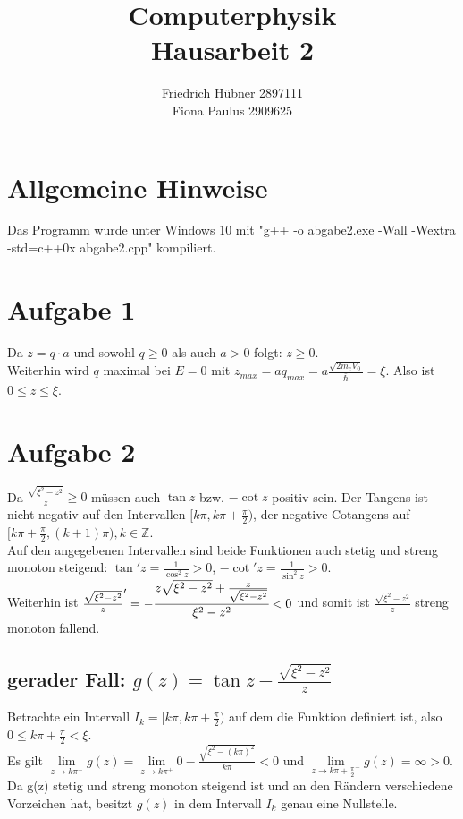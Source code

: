 \documentclass{scrartcl}
\author{Friedrich Hübner 2897111\\
Fiona Paulus 2909625}
\title{Computerphysik\\Hausarbeit 2}
\begin{document}
\maketitle
\newpage

\section{Allgemeine Hinweise}
Das Programm wurde unter Windows 10 mit "g++ -o abgabe2.exe -Wall -Wextra -std=c++0x abgabe2.cpp" kompiliert.

\section{Aufgabe 1}
Da $z = q \cdot a$ und sowohl $q\geq 0$ als auch $a > 0$ folgt: $z \geq 0$.\\
Weiterhin wird $q$ maximal bei $E = 0$ mit $z_{max} = a q_{max} = a\frac{\sqrt{2m_eV_0}}{\bar{\hslash}} = \xi$. Also ist $0 \leq z \leq \xi$.

\section{Aufgabe 2}
Da $\frac{\sqrt{\xi^2-z^2}}{z} \geq 0$ müssen auch $\tan z$ bzw. $-\cot z$ positiv sein. Der Tangens ist nicht-negativ auf den Intervallen $[k\pi, k\pi+\frac{\pi}{2})$, der negative Cotangens auf $[k\pi+\frac{\pi}{2}, (k+1)\pi), k \in \mathbb{Z}$.\\
Auf den angegebenen Intervallen sind beide Funktionen auch stetig und streng monoton steigend: $\tan' z = \frac{1}{\cos^2 z} > 0$, $-\cot' z = \frac{1}{\sin^2 z} > 0$.\\
Weiterhin ist $\frac{\sqrt{\xi^2-z^2}}{z}' = -\cfrac{z\sqrt{\xi^2-z^2} + \frac{z}{\sqrt{\xi^2-z^2}}}{\xi^2-z^2} < 0$ und somit ist $\frac{\sqrt{\xi^2-z^2}}{z}$ streng monoton fallend.\\

\subsection{gerader Fall: $g(z) = \tan z - \frac{\sqrt{\xi^2-z^2}}{z}$}

Betrachte ein Intervall $I_k = [k\pi, k\pi+\frac{\pi}{2})$ auf dem die Funktion definiert ist, also $0 \leq k\pi + \frac{\pi}{2} < \xi$.\\
Es gilt $\lim\limits_{z\to k\pi^+}{g(z)} = \lim\limits_{z\to k\pi^+}{0 - \frac{\sqrt{\xi^2-(k\pi)^2}}{k\pi}} < 0$ und $\lim\limits_{z\to k\pi+\frac{\pi}{2}^-}{g(z)} = \infty > 0$. Da g(z) stetig und streng monoton steigend ist und an den Rändern verschiedene Vorzeichen hat, besitzt $g(z)$ in dem Intervall $I_k$ genau eine Nullstelle.\\
\end{document}
